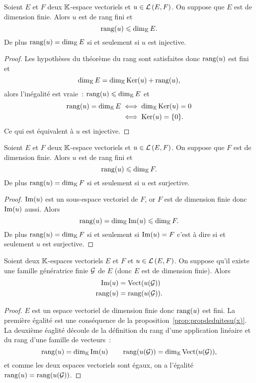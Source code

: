 \begin{theo}
  Soient $E$ et $F$ deux $\mathbb{K}$-espace vectoriels et $u \in \mathcal{L}\left(E,F\right)$. On suppose que $E$ est de dimension finie. Alors $u$ est de rang fini et
  \begin{equation}
    \operatorname{rang}(u) \leqslant \operatorname{dim}_{\mathbb{K}} E.
  \end{equation}
De plus $\operatorname{rang}(u) = \operatorname{dim}_{\mathbb{K}} E$ si et seulement si $u$ est injective.
\end{theo}
\begin{proof}
  Les hypothèses du théorème du rang sont satisfaites donc $\operatorname{rang}(u)$ est fini et
  \begin{equation}
    \operatorname{dim}_{\mathbb{K}} E = \operatorname{dim}_{\mathbb{K}} \operatorname{Ker}(u) + \operatorname{rang}(u),
  \end{equation}
  alors l'inégalité est vraie~: $\operatorname{rang}(u) \leqslant \operatorname{dim}_{\mathbb{K}} E$ et
  \begin{align}
    \operatorname{rang}(u) = \operatorname{dim}_{\mathbb{K}} E &\iff \operatorname{dim}_{\mathbb{K}} \operatorname{Ker}(u) = 0\\
    &\iff \operatorname{Ker}(u)=\{0\}.
  \end{align}
  Ce qui est équivalent à $u$ est injective.
\end{proof}

\begin{theo}
  Soient $E$ et $F$ deux $\mathbb{K}$-espace vectoriels et $u \in \mathcal{L}\left(E,F\right)$. On suppose que $F$ est de dimension finie. Alors $u$ est de rang fini et
\begin{equation}
    \operatorname{rang}(u) \leqslant \operatorname{dim}_{\mathbb{K}} F.
  \end{equation}
De plus $\operatorname{rang}(u) = \operatorname{dim}_{\mathbb{K}} F$ si et seulement si $u$ est surjective.
\end{theo}
\begin{proof}
  $\operatorname{Im}(u)$ est un sous-espace vectoriel de $F$, or $F$ est de dimension finie donc $\operatorname{Im}(u)$ aussi. Alors
  \begin{equation}
    \operatorname{rang}(u) = \operatorname{dim}_{\mathbb{K}} \operatorname{Im}(u) \leqslant \operatorname{dim}_{\mathbb{K}} F.
  \end{equation}
  De plus $\operatorname{rang}(u) = \operatorname{dim}_{\mathbb{K}} F$ si et seulement si $\operatorname{Im}(u)=F$ c'est à dire si et seulement $u$ est surjective.
\end{proof}

\begin{prop}
  Soient deux $\mathbb{K}$-espaces vectoriels $E$ et $F$ et $u \in \mathcal{L}\left(E,F\right)$. On suppose qu'il existe une famille génératrice finie $\mathcal{G}$ de $E$ (donc $E$ est de dimension finie). Alors
  \begin{align}
    \operatorname{Im}(u) &= \operatorname{Vect}(u(\mathcal{G})) \\
    \operatorname{rang}(u) &= \operatorname{rang}(u(\mathcal{G})).
  \end{align}
\end{prop}
\begin{proof}
  $E$ est un espace vectoriel de dimension finie donc $\operatorname{rang}(u)$ est fini. La première égalité est une conséquence de la proposition~\ref{prop:propdeduitesu(x)}. La deuxième éaglité découle de la définition du rang d'une application linéaire et du rang d'une famille de vecteurs~:
  \begin{equation}
    \operatorname{rang}(u) = \operatorname{dim}_{\mathbb{K}} \operatorname{Im}(u) \qquad \operatorname{rang}(u(\mathcal{G}))=\operatorname{dim}_{\mathbb{K}} \operatorname{Vect}(u(\mathcal{G})),
  \end{equation}
  et comme les deux espaces vectoriels sont égaux, on a l'égalité $\operatorname{rang}(u) = \operatorname{rang}(u(\mathcal{G}))$.
\end{proof}

